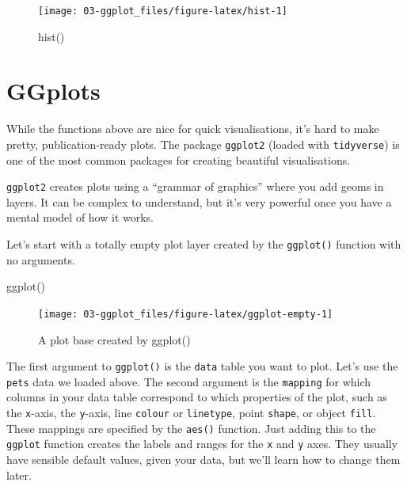 \documentclass[
  oneside]{book}
\newenvironment{Shaded}{\begin{snugshade}}{\end{snugshade}}
\newcommand{\FunctionTok}[1]{\textcolor[rgb]{0.00,0.00,0.00}{#1}}
\newcommand{\NormalTok}[1]{#1}
\begin{document}
\begin{figure}

{\centering \texttt{[image: 03-ggplot\_files/figure-latex/hist-1]} 

}

\caption{hist()}\label{fig:hist}
\end{figure}

\hypertarget{ggplots}{%
\section{GGplots}\label{ggplots}}

While the functions above are nice for quick visualisations, it's hard to make pretty, publication-ready plots. The package \texttt{ggplot2} (loaded with \texttt{tidyverse}) is one of the most common packages for creating beautiful visualisations.

\texttt{ggplot2} creates plots using a ``grammar of graphics'' where you add geoms in layers. It can be complex to understand, but it's very powerful once you have a mental model of how it works.

Let's start with a totally empty plot layer created by the \texttt{ggplot()} function with no arguments.

\begin{Shaded}
\begin{Highlighting}[]
\FunctionTok{ggplot}\NormalTok{()}
\end{Highlighting}
\end{Shaded}

\begin{figure}

{\centering \texttt{[image: 03-ggplot\_files/figure-latex/ggplot-empty-1]} 

}

\caption{A plot base created by ggplot()}\label{fig:ggplot-empty}
\end{figure}

The first argument to \texttt{ggplot()} is the \texttt{data} table you want to plot. Let's use the \texttt{pets} data we loaded above. The second argument is the \texttt{mapping} for which columns in your data table correspond to which properties of the plot, such as the \texttt{x}-axis, the \texttt{y}-axis, line \texttt{colour} or \texttt{linetype}, point \texttt{shape}, or object \texttt{fill}. These mappings are specified by the \texttt{aes()} function. Just adding this to the \texttt{ggplot} function creates the labels and ranges for the \texttt{x} and \texttt{y} axes. They usually have sensible default values, given your data, but we'll learn how to change them later.
\end{document}
